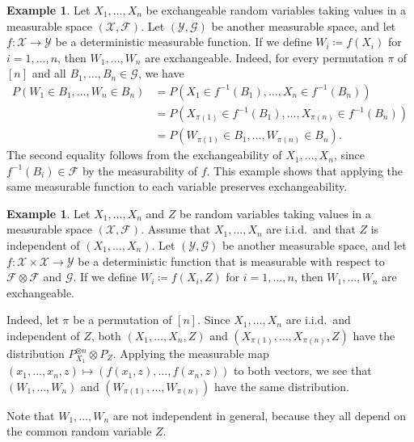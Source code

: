 \documentclass[a4paper,12pt]{article}
\numberwithin{equation}{section}
\theoremstyle{plain}
\theoremstyle{definition}
\newtheorem{example}[theorem]{Example}
\theoremstyle{remark}
\begin{document}
\begin{example}
\label{example:ch8-05}
    Let $X_1,\dots,X_n$ be exchangeable random variables taking values in a measurable space $(\mathcal{X},\mathcal{F})$. Let $(\mathcal{Y},\mathcal{G})$ be another measurable space, and let $f:\mathcal{X}\to\mathcal{Y}$ be a deterministic measurable function. If we define $W_i\coloneqq f(X_i)$ for $i=1,\dots,n$, then $W_1,\dots,W_n$ are exchangeable. Indeed, for every permutation $\pi$ of $[n]$ and all $B_1,\dots,B_n\in\mathcal{G}$, we have
    \begin{align*}
        P(W_1\in B_1,\dots,W_n\in B_n)
        &= P(X_1\in f^{-1}(B_1),\dots,X_n\in f^{-1}(B_n))\\
        &= P(X_{\pi(1)}\in f^{-1}(B_1),\dots,X_{\pi(n)}\in f^{-1}(B_n))\\
        &= P(W_{\pi(1)}\in B_1,\dots,W_{\pi(n)}\in B_n).
    \end{align*}
    The second equality follows from the exchangeability of $X_1,\dots,X_n$, since $f^{-1}(B_i)\in\mathcal{F}$ by the measurability of $f$. This example shows that applying the same measurable function to each variable preserves exchangeability.
\end{example}

\begin{example}
\label{example:ch8-06}
    Let $X_1,\dots,X_n$ and $Z$ be random variables taking values in a measurable space $(\mathcal{X},\mathcal{F})$. Assume that $X_1,\dots,X_n$ are i.i.d.\ and that $Z$ is independent of $(X_1,\dots,X_n)$. Let $(\mathcal{Y},\mathcal{G})$ be another measurable space, and let $f:\mathcal{X}\times\mathcal{X}\to\mathcal{Y}$ be a deterministic function that is measurable with respect to $\mathcal{F}\otimes\mathcal{F}$ and $\mathcal{G}$. If we define $W_i\coloneqq f(X_i,Z)$ for $i=1,\dots,n$, then $W_1,\dots,W_n$ are exchangeable.

    Indeed, let $\pi$ be a permutation of $[n]$. Since $X_1,\dots,X_n$ are i.i.d.\ and independent of $Z$, both $(X_1,\dots,X_n,Z)$ and $(X_{\pi(1)},\dots,X_{\pi(n)},Z)$ have the distribution $P_{X_1}^{\otimes n}\otimes P_Z$. Applying the measurable map $(x_1,\dots,x_n,z)\mapsto(f(x_1,z),\dots,f(x_n,z))$ to both vectors, we see that $(W_1,\dots,W_n)$ and $(W_{\pi(1)},\dots,W_{\pi(n)})$ have the same distribution.

    Note that $W_1,\dots,W_n$ are not independent in general, because they all depend on the common random variable $Z$.
\end{example}
\end{document}
